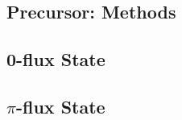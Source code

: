 \documentclass[../../../main.tex]{subfiles}
\begin{document}
\subsection{Precursor: Methods}


\subsection{0-flux State}


\subsection{$\pi$-flux State}


\nocite{*}
\printbibliography
\end{document}
